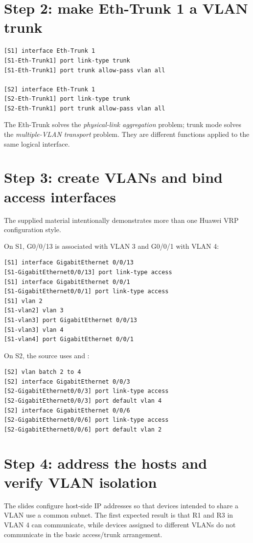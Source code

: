\section{Step 2: make Eth-Trunk 1 a VLAN trunk}
\begin{lstlisting}[style=dcnterminal]
[S1] interface Eth-Trunk 1
[S1-Eth-Trunk1] port link-type trunk
[S1-Eth-Trunk1] port trunk allow-pass vlan all

[S2] interface Eth-Trunk 1
[S2-Eth-Trunk1] port link-type trunk
[S2-Eth-Trunk1] port trunk allow-pass vlan all
\end{lstlisting}

\begin{keyidea}
The Eth-Trunk solves the \emph{physical-link aggregation} problem; trunk mode solves the \emph{multiple-VLAN transport} problem. They are different functions applied to the same logical interface.
\end{keyidea}

\section{Step 3: create VLANs and bind access interfaces}
The supplied material intentionally demonstrates more than one Huawei VRP configuration style.

On S1, G0/0/13 is associated with VLAN 3 and G0/0/1 with VLAN 4:
\begin{lstlisting}[style=dcnterminal]
[S1] interface GigabitEthernet 0/0/13
[S1-GigabitEthernet0/0/13] port link-type access
[S1] interface GigabitEthernet 0/0/1
[S1-GigabitEthernet0/0/1] port link-type access
[S1] vlan 2
[S1-vlan2] vlan 3
[S1-vlan3] port GigabitEthernet 0/0/13
[S1-vlan3] vlan 4
[S1-vlan4] port GigabitEthernet 0/0/1
\end{lstlisting}

On S2, the source uses  and :
\begin{lstlisting}[style=dcnterminal]
[S2] vlan batch 2 to 4
[S2] interface GigabitEthernet 0/0/3
[S2-GigabitEthernet0/0/3] port link-type access
[S2-GigabitEthernet0/0/3] port default vlan 4
[S2] interface GigabitEthernet 0/0/6
[S2-GigabitEthernet0/0/6] port link-type access
[S2-GigabitEthernet0/0/6] port default vlan 2
\end{lstlisting}

\section{Step 4: address the hosts and verify VLAN isolation}
The slides configure host-side IP addresses so that devices intended to share a VLAN use a common subnet. The first expected result is that R1 and R3 in VLAN 4 can communicate, while devices assigned to different VLANs do not communicate in the basic access/trunk arrangement.

